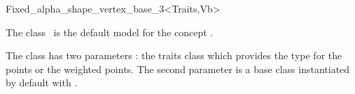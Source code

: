 
\begin{ccRefClass}{Fixed_alpha_shape_vertex_base_3<Traits,Vb>}

\ccDefinition

The class \ccRefName\ is the default  model for the concept
.

The class has two parameters : the traits class 
which provides the type for the points or the weighted points.
The second parameter  is a base class instantiated by default
with . 




\ccIsModel
{}


\ccInheritsFrom


\end{ccRefClass}
